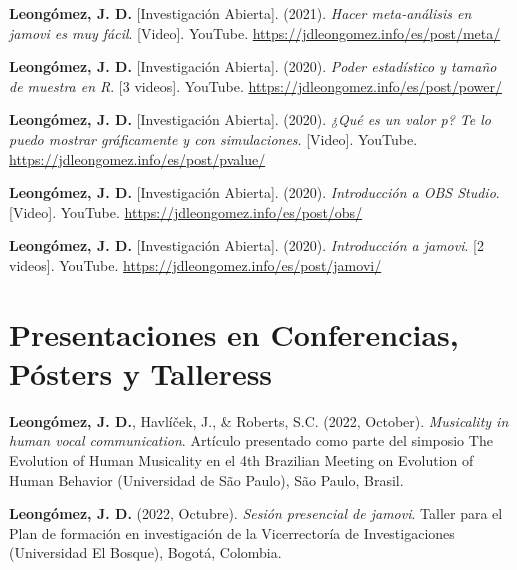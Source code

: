 \documentclass[11pt,a4paper,]{awesome-cv}
\begin{document}
\begingroup
\setlength{\parindent}{-0.5in}
\setlength{\leftskip}{0.5in}

\hypertarget{refs_IA}{}
\leavevmode{}%
\textbf{Leongómez, J. D.} {[}Investigación Abierta{]}. (2021).
\emph{{Hacer meta-análisis en jamovi es muy fácil}}. {[}Video{]}.
YouTube. \url{https://jdleongomez.info/es/post/meta/}

\leavevmode{}%
\textbf{Leongómez, J. D.} {[}Investigación Abierta{]}. (2020).
\emph{{Poder estadístico y tamaño de muestra en R}}. {[}3 videos{]}.
YouTube. \url{https://jdleongomez.info/es/post/power/}

\leavevmode{}%
\textbf{Leongómez, J. D.} {[}Investigación Abierta{]}. (2020).
\emph{{¿Qué es un valor p? Te lo puedo mostrar gráficamente y con
simulaciones}}. {[}Video{]}. YouTube.
\url{https://jdleongomez.info/es/post/pvalue/}

\leavevmode{}%
\textbf{Leongómez, J. D.} {[}Investigación Abierta{]}. (2020).
\emph{{Introducción a OBS Studio}}. {[}Video{]}. YouTube.
\url{https://jdleongomez.info/es/post/obs/}

\leavevmode{}%
\textbf{Leongómez, J. D.} {[}Investigación Abierta{]}. (2020).
\emph{{Introducción a jamovi}}. {[}2 videos{]}. YouTube.
\url{https://jdleongomez.info/es/post/jamovi/}

\endgroup

\hypertarget{presentaciones-en-conferencias-puxf3sters-y-talleress}{%
\section{Presentaciones en Conferencias, Pósters y
Talleress}\label{presentaciones-en-conferencias-puxf3sters-y-talleress}}

\begingroup
\setlength{\parindent}{-0.5in}
\setlength{\leftskip}{0.5in}

\textbf{Leongómez, J. D.}, Havlíček, J., \& Roberts, S.C. (2022,
October). \emph{Musicality in human vocal communication}. Artículo
presentado como parte del simposio The Evolution of Human Musicality en
el 4th Brazilian Meeting on Evolution of Human Behavior (Universidad de
São Paulo), São Paulo, Brasil.

\textbf{Leongómez, J. D.} (2022, Octubre). \emph{Sesión presencial de
jamovi}. Taller para el Plan de formación en investigación de la
Vicerrectoría de Investigaciones (Universidad El Bosque), Bogotá,
Colombia.
\end{document}

